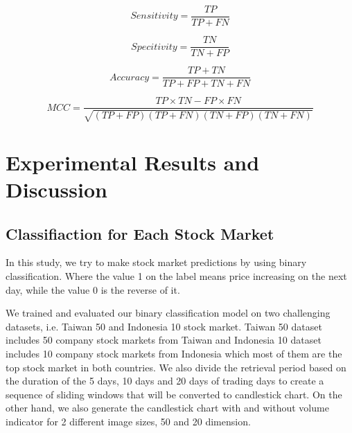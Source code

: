 \documentclass[10pt,twocolumn]{article}
\begin{document}
\begin{equation}
Sensitivity=\frac{TP}{TP+FN}
\end{equation}

\begin{equation}
Specitivity=\frac{TN}{TN+FP}
\end{equation}

\begin{equation}
Accuracy=\frac{TP+TN}{TP+FP+TN+FN}
\end{equation}

\begin{equation}
MCC=\frac{TP\times TN-FP \times FN}{\sqrt{(TP+FP)(TP+FN)(TN+FP)(TN+FN)}}
\end{equation}

\section{Experimental Results and Discussion}
\subsection{Classifiaction for Each Stock Market}
In this study, we try to make stock market predictions by using binary classification. Where the value 1 on the label means price increasing on the next day, while the value 0 is the reverse of it.
\par
We trained and evaluated our binary classification model on two challenging datasets, i.e. Taiwan 50 and Indonesia 10 stock market. Taiwan 50 dataset includes 50 company stock markets from Taiwan and Indonesia 10 dataset includes 10 company stock markets from Indonesia which most of them are the top stock market in both countries. We also divide the retrieval period based on the duration of the 5 days, 10 days and 20 days of trading days to create a sequence of sliding windows that will be converted to candlestick chart. On the other hand, we also generate the candlestick chart with and without volume indicator for 2 different image sizes, 50 and 20 dimension.
\end{document}
